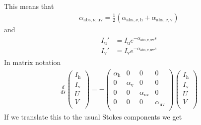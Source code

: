 \documentclass[letterpaper,10pt,english]{sphinxmanual}
\begin{document}
This means that
\begin{equation*}
\begin{split}\alpha_{\mathrm{abs},\nu,\mathrm{uv}} =
\frac{1}{2}\left(\alpha_{\mathrm{abs},\nu,\mathrm{h}}+\alpha_{\mathrm{abs},\nu,\mathrm{v}}\right)\end{split}
\end{equation*}
and
\begin{equation*}
\begin{split}\begin{split}
I_{\mathrm{u}}' &= I_{\mathrm{u}} e^{-\alpha_{\mathrm{abs},\nu,\mathrm{uv}}s}\\
I_{\mathrm{v}}' &= I_{\mathrm{v}} e^{-\alpha_{\mathrm{abs},\nu,\mathrm{uv}}s}
\end{split}\end{split}
\end{equation*}
In matrix notation
\begin{equation*}
\begin{split}\frac{d}{ds}
\left(\begin{matrix}
I_{\mathrm{h}} \\
I_{\mathrm{v}} \\
U \\
V \\
\end{matrix}\right)
= -
\left(\begin{matrix}
\alpha_{\mathrm{h}} & 0 & 0 & 0 \\
0 & \alpha_{\mathrm{v}} & 0 & 0  \\
0 & 0 & \alpha_{\mathrm{uv}} & 0 \\
0 & 0 & 0 & \alpha_{\mathrm{uv}} \\
\end{matrix}\right)
\left(\begin{matrix}
I_{\mathrm{h}} \\
I_{\mathrm{v}} \\
U \\
V \\
\end{matrix}\right)\end{split}
\end{equation*}
If we translate this to the usual Stokes components we get
\end{document}

